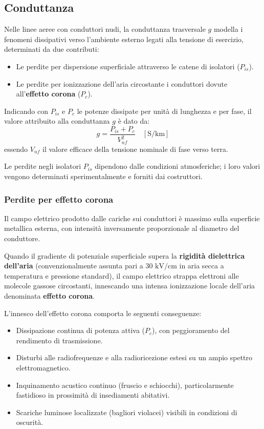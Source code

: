 \subsection{Conduttanza}
Nelle linee aeree con conduttori nudi, la conduttanza trasversale $g$ modella i fenomeni dissipativi verso l'ambiente esterno legati alla tensione di esercizio, determinati da due contributi:
\begin{itemize}
    \item Le perdite per dispersione superficiale attraverso le catene di isolatori ($P_{is}$).
    \item Le perdite per ionizzazione dell'aria circostante i conduttori dovute all'\textbf{effetto corona} ($P_c$).
\end{itemize}

Indicando con $P_{is}$ e $P_c$ le potenze dissipate per unità di lunghezza e per fase, il valore attribuito alla conduttanza $g$ è dato da:
\[g = \frac{P_{is} + P_c}{V_{nf}^2} \quad [\text{S/km}]\]
essendo $V_{nf}$ il valore efficace della tensione nominale di fase verso terra.

Le perdite negli isolatori $P_{is}$ dipendono dalle condizioni atmosferiche; i loro valori vengono determinati sperimentalmente e forniti dai costruttori.

\subsubsection{Perdite per effetto corona}
Il campo elettrico prodotto dalle cariche sui conduttori è massimo sulla superficie metallica esterna, con intensità inversamente proporzionale al diametro del conduttore. 

Quando il gradiente di potenziale superficiale supera la \textbf{rigidità dielettrica dell'aria} (convenzionalmente assunta pari a $30\text{ kV/cm}$ in aria secca a temperatura e pressione standard), il campo elettrico strappa elettroni alle molecole gassose circostanti, innescando una intensa ionizzazione locale dell'aria denominata \textbf{effetto corona}.

\newpage
L'innesco dell'effetto corona comporta le seguenti conseguenze:
\begin{itemize}
    \item Dissipazione continua di potenza attiva ($P_c$), con peggioramento del rendimento di trasmissione.
    \item Disturbi alle radiofrequenze e alla radioricezione estesi su un ampio spettro elettromagnetico.
    \item Inquinamento acustico continuo (fruscio e schiocchi), particolarmente fastidioso in prossimità di insediamenti abitativi.
    \item Scariche luminose localizzate (bagliori violacei) visibili in condizioni di oscurità.
\end{itemize}

